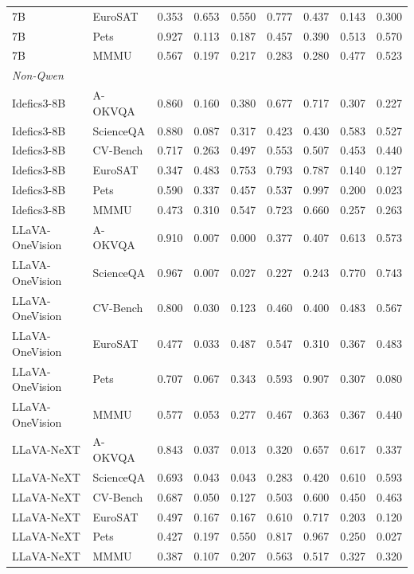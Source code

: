 \begin{tabular}{llrrrrrrr}
7B & EuroSAT & 0.353 & 0.653 & 0.550 & 0.777 & 0.437 & 0.143 & 0.300 \\
7B & Pets & 0.927 & 0.113 & 0.187 & 0.457 & 0.390 & 0.513 & 0.570 \\
7B & MMMU & 0.567 & 0.197 & 0.217 & 0.283 & 0.280 & 0.477 & 0.523 \\
\midrule
\multicolumn{9}{l}{\textit{Non-Qwen}}\\
Idefics3-8B & A-OKVQA & 0.860 & 0.160 & 0.380 & 0.677 & 0.717 & 0.307 & 0.227 \\
Idefics3-8B & ScienceQA & 0.880 & 0.087 & 0.317 & 0.423 & 0.430 & 0.583 & 0.527 \\
Idefics3-8B & CV-Bench & 0.717 & 0.263 & 0.497 & 0.553 & 0.507 & 0.453 & 0.440 \\
Idefics3-8B & EuroSAT & 0.347 & 0.483 & 0.753 & 0.793 & 0.787 & 0.140 & 0.127 \\
Idefics3-8B & Pets & 0.590 & 0.337 & 0.457 & 0.537 & 0.997 & 0.200 & 0.023 \\
Idefics3-8B & MMMU & 0.473 & 0.310 & 0.547 & 0.723 & 0.660 & 0.257 & 0.263 \\
LLaVA-OneVision & A-OKVQA & 0.910 & 0.007 & 0.000 & 0.377 & 0.407 & 0.613 & 0.573 \\
LLaVA-OneVision & ScienceQA & 0.967 & 0.007 & 0.027 & 0.227 & 0.243 & 0.770 & 0.743 \\
LLaVA-OneVision & CV-Bench & 0.800 & 0.030 & 0.123 & 0.460 & 0.400 & 0.483 & 0.567 \\
LLaVA-OneVision & EuroSAT & 0.477 & 0.033 & 0.487 & 0.547 & 0.310 & 0.367 & 0.483 \\
LLaVA-OneVision & Pets & 0.707 & 0.067 & 0.343 & 0.593 & 0.907 & 0.307 & 0.080 \\
LLaVA-OneVision & MMMU & 0.577 & 0.053 & 0.277 & 0.467 & 0.363 & 0.367 & 0.440 \\
LLaVA-NeXT & A-OKVQA & 0.843 & 0.037 & 0.013 & 0.320 & 0.657 & 0.617 & 0.337 \\
LLaVA-NeXT & ScienceQA & 0.693 & 0.043 & 0.043 & 0.283 & 0.420 & 0.610 & 0.593 \\
LLaVA-NeXT & CV-Bench & 0.687 & 0.050 & 0.127 & 0.503 & 0.600 & 0.450 & 0.463 \\
LLaVA-NeXT & EuroSAT & 0.497 & 0.167 & 0.167 & 0.610 & 0.717 & 0.203 & 0.120 \\
LLaVA-NeXT & Pets & 0.427 & 0.197 & 0.550 & 0.817 & 0.967 & 0.250 & 0.027 \\
LLaVA-NeXT & MMMU & 0.387 & 0.107 & 0.207 & 0.563 & 0.517 & 0.327 & 0.320 \\
\bottomrule
\end{tabular}

